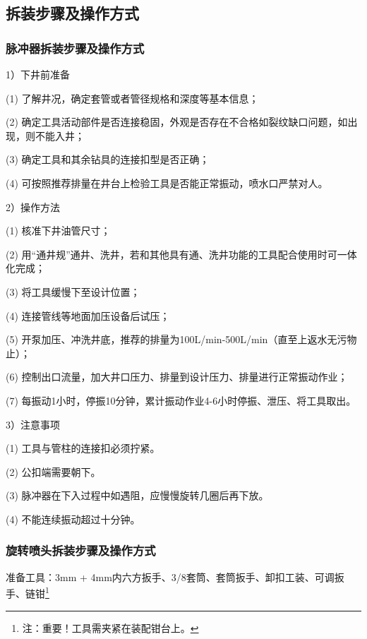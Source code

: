 ﻿%
\subsection{拆装步骤及操作方式}
\subsubsection{脉冲器拆装步骤及操作方式}
1）下井前准备

(1) 了解井况，确定套管或者管径规格和深度等基本信息；

(2) 确定工具活动部件是否连接稳固，外观是否存在不合格如裂纹缺口问题，如出现，则不能入井；

(3) 确定工具和其余钻具的连接扣型是否正确；

(4) 可按照推荐排量在井台上检验工具是否能正常振动，喷水口严禁对人。

2）操作方法

(1) 核准下井油管尺寸；

(2) 用“通井规”通井、洗井，若和其他具有通、洗井功能的工具配合使用时可一体化完成；

(3) 将工具缓慢下至设计位置；

(4) 连接管线等地面加压设备后试压；

(5) 开泵加压、冲洗井底，推荐的排量为100L/min-500L/min（直至上返水无污物止）；

(6) 控制出口流量，加大井口压力、排量到设计压力、排量进行正常振动作业；

(7) 每振动1小时，停振10分钟，累计振动作业4-6小时停振、泄压、将工具取出。

3）注意事项

(1) 工具与管柱的连接扣必须拧紧。

(2) 公扣端需要朝下。

(3) 脉冲器在下入过程中如遇阻，应慢慢旋转几圈后再下放。

(4) 不能连续振动超过十分钟。

\subsubsection{旋转喷头拆装步骤及操作方式}


准备工具：3mm + 4mm内六方扳手、3/8\inch 套筒、套筒扳手、卸扣工装、可调扳手、链钳\footnote{注：重要！工具需夹紧在装配钳台上。}

